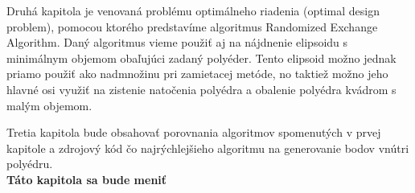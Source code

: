 Druhá kapitola je venovaná problému optimálneho riadenia (optimal design problem), pomocou ktorého predstavíme algoritmus Randomized Exchange Algorithm. Daný algoritmus vieme použiť aj na nájdnenie elipsoidu s minimálnym objemom obaľujúci zadaný polyéder. Tento elipsoid možno jednak priamo použiť ako nadmnožinu pri zamietacej metóde, no taktiež možno jeho hlavné osi využiť na zistenie natočenia polyédra a obalenie polyédra kvádrom s malým objemom.

Tretia kapitola bude obsahovať porovnania algoritmov spomenutých v prvej kapitole a zdrojový kód čo najrýchlejšieho algoritmu na generovanie bodov vnútri polyédru. \\

\textbf{Táto kapitola sa bude meniť}
